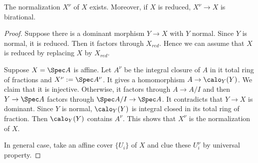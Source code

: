     \begin{proposition}
        The normalization $X^\nu$ of $X$ exists.
        Moreover, if $X$ is reduced, $X^\nu \to X$ is birational.
    \end{proposition}
    \begin{proof}
        Suppose there is a dominant morphism $Y \to X$ with $Y$ normal.
        Since $Y$ is normal, it is reduced.
        Then it factors through $X_{red}$.
        Hence we can assume that $X$ is reduced by replacing $X$ by $X_{red}$.

        Suppose $X = \Spec A$ is affine.
        Let $A^\nu$ be the integral closure of $A$ in it total ring of fractions and $X^\nu := \Spec A^\nu$.
        It gives a homomorphism $A \to \calo_Y(Y)$.
        We claim that it is injective.
        Otherwise, it factors through $A \to A/I$ and then $Y \to \Spec A$ factors through $\Spec A/I \to \Spec A$.
        It contradicts that $Y \to X$ is dominant.
        Since $Y$ is normal, $\calo_Y(Y)$ is integral closed in its total ring of fraction.
        Then $\calo_Y(Y)$ contains $A^\nu$.
        This shows that $X^\nu$ is the normalization of $X$.

        In general case, take an affine cover $\{U_i\}$ of $X$ and clue these $U_i^\nu$ by universal property.
    \end{proof}




